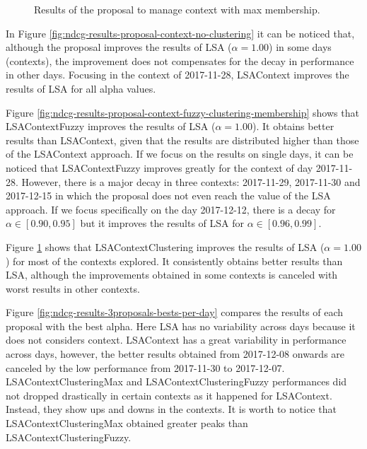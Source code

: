 \documentclass[preprint]{elsarticle}
\begin{document}
\begin{spacing}{1.5}
\begin{figure}[htb]
    \caption{Results of the proposal to manage context with max membership.}
    \label{fig:ndcg-results-proposal-context-fuzzy-clustering-max}
\end{figure}

In Figure \ref{fig:ndcg-results-proposal-context-no-clustering} it can be noticed that, although the proposal improves the results of LSA ($\alpha = 1.00$) in some days (contexts), the improvement does not compensates for the decay in performance in other days. Focusing in the context of 2017-11-28, LSAContext improves the results of LSA for all alpha values.

Figure \ref{fig:ndcg-results-proposal-context-fuzzy-clustering-membership} shows that LSAContextFuzzy improves the results of LSA ($\alpha = 1.00$). It obtains better results than LSAContext, given that the results are distributed higher than those of the LSAContext approach. If we focus on the results on single days, it can be noticed that LSAContextFuzzy improves greatly for the context of day 2017-11-28. However, there is a major decay in three contexts: 2017-11-29, 2017-11-30 and 2017-12-15 in which the proposal does not even reach the value of the LSA approach. If we focus specifically on the day 2017-12-12, there is a decay for $\alpha \in [0.90,0.95]$ but it improves the results of LSA for $\alpha \in [0.96,0.99]$.

Figure \ref{fig:ndcg-results-proposal-context-fuzzy-clustering-max} shows that LSAContextClustering improves the results of LSA ($\alpha = 1.00$) for most of the contexts explored. It consistently obtains better results than LSA, although the improvements obtained in some contexts is canceled with worst results in other contexts.


Figure \ref{fig:ndcg-results-3proposals-bests-per-day} compares the results of each proposal with the best alpha. Here LSA has no variability across days because it does not considers context. LSAContext has a great variability in performance across days, however, the better results obtained from 2017-12-08 onwards are canceled by the low performance from 2017-11-30 to 2017-12-07. LSAContextClusteringMax and LSAContextClusteringFuzzy performances did not dropped drastically in certain contexts as it happened for LSAContext. Instead, they show ups and downs in the contexts. It is worth to notice that LSAContextClusteringMax obtained greater peaks than LSAContextClusteringFuzzy.


\end{spacing}
\end{document}
